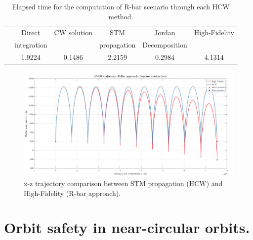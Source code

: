 		\begin{table}[!htb]
		\centering
		\begin{tabular}{|c|c|c|c|c|c|}
		\hline 
		\rowcolor{Gray!10}
		\multirow{2}{*}{\textbf{Method}} 	& Direct 		& CW solution 	& STM 			& Jordan  			& High-Fidelity \\ 
		\rowcolor{Gray!10}
								& integration 	&   				& propagation 	&  Decomposition 	&  \\ 
		\hline 
		\ccg{\textbf{Elapsed time} [$s$]} & 1.9224 & 0.1486 & 2.2159 & 0.2984 & 4.1314 \\ 
		\hline 
		\end{tabular} 
		\caption{Elapsed time for the computation of R-bar scenario through each HCW method.}
		\label{tabCh2:HCW_Rbar}
		\end{table}
		\begin{figure}[!htb]
		\begin{changemargin}{-2.2cm}{-1cm}
		\begin{adjustbox}{width=1.2\textwidth}
		\centering\includegraphics[width = \linewidth]{Chapters/Chapter_02/LVLH_trajectory__R_Bar_approach_IP}
		\end{adjustbox}
		\end{changemargin}
		\caption{x-z trajectory comparison between STM propagation (HCW) and High-Fidelity (R-bar approach).}
		\label{figCh2:LVLH_R_bar}
		\end{figure}

\section{Orbit safety in near-circular orbits.}
%
%
